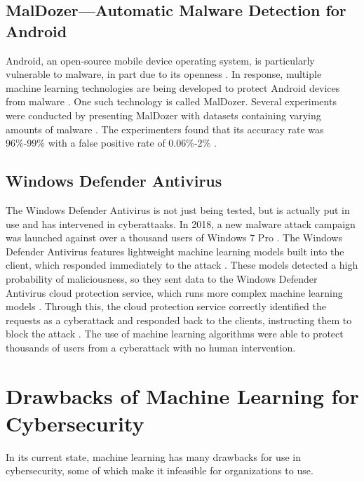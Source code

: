 \subsection{MalDozer---Automatic Malware Detection for Android}
Android, an open-source mobile device operating system, is particularly vulnerable to malware, in part due to its openness \cite{sustainablecities2021}.
In response, multiple machine learning technologies are being developed to protect Android devices from malware \cite{sustainablecities2021}.
One such technology is called MalDozer.
Several experiments were conducted by presenting MalDozer with datasets containing varying amounts of malware \cite{sustainablecities2021}.
The experimenters found that its accuracy rate was 96\%-99\% with a false positive rate of 0.06\%-2\% \cite{sustainablecities2021}.

\subsection{Windows Defender Antivirus}
The Windows Defender Antivirus is not just being tested, but is actually put in use and has intervened in cyberattaaks.
In 2018, a new malware attack campaign was launched against over a thousand users of Windows 7 Pro \cite{microsoft2018}.
The Windows Defender Antivirus features lightweight machine learning models built into the client, which responded immediately to the attack \cite{microsoft2018}.
These models detected a high probability of maliciousness, so they sent data to the Windows Defender Antivirus cloud protection service, which runs more complex machine learning models \cite{microsoft2018}.
Through this, the cloud protection service correctly identified the requests as a cyberattack and responded back to the clients, instructing them to block the attack \cite{microsoft2018}.
The use of machine learning algorithms were able to protect thousands of users from a cyberattack with no human intervention.

\section{Drawbacks of Machine Learning for Cybersecurity}
In its current state, machine learning has many drawbacks for use in cybersecurity, some of which make it infeasible for organizations to use.

